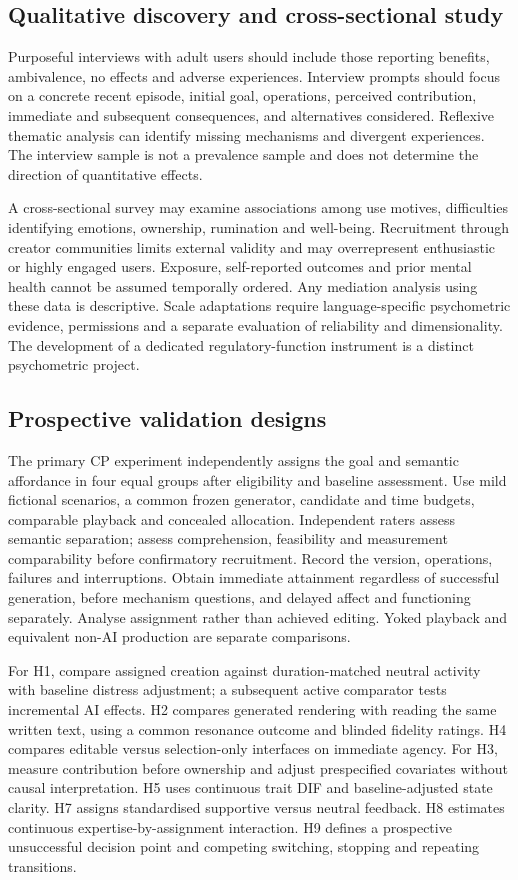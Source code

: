 \documentclass[11pt,a4paper]{article}
\begin{document}
\subsection{Qualitative discovery and cross-sectional study}
Purposeful interviews with adult users should include those reporting benefits, ambivalence, no effects and adverse experiences. Interview prompts should focus on a concrete recent episode, initial goal, operations, perceived contribution, immediate and subsequent consequences, and alternatives considered. Reflexive thematic analysis can identify missing mechanisms and divergent experiences. The interview sample is not a prevalence sample and does not determine the direction of quantitative effects.

A cross-sectional survey may examine associations among use motives, difficulties identifying emotions, ownership, rumination and well-being. Recruitment through creator communities limits external validity and may overrepresent enthusiastic or highly engaged users. Exposure, self-reported outcomes and prior mental health cannot be assumed temporally ordered. Any mediation analysis using these data is descriptive. Scale adaptations require language-specific psychometric evidence, permissions and a separate evaluation of reliability and dimensionality. The development of a dedicated regulatory-function instrument is a distinct psychometric project.

\subsection{Prospective validation designs}
The primary CP experiment independently assigns the goal and semantic affordance in four equal groups after eligibility and baseline assessment. Use mild fictional scenarios, a common frozen generator, candidate and time budgets, comparable playback and concealed allocation. Independent raters assess semantic separation; assess comprehension, feasibility and measurement comparability before confirmatory recruitment. Record the version, operations, failures and interruptions. Obtain immediate attainment regardless of successful generation, before mechanism questions, and delayed affect and functioning separately. Analyse assignment rather than achieved editing. Yoked playback and equivalent non-AI production are separate comparisons.

For H1, compare assigned creation against duration-matched neutral activity with baseline distress adjustment; a subsequent active comparator tests incremental AI effects. H2 compares generated rendering with reading the same written text, using a common resonance outcome and blinded fidelity ratings. H4 compares editable versus selection-only interfaces on immediate agency. For H3, measure contribution before ownership and adjust prespecified covariates without causal interpretation. H5 uses continuous trait DIF and baseline-adjusted state clarity. H7 assigns standardised supportive versus neutral feedback. H8 estimates continuous expertise-by-assignment interaction. H9 defines a prospective unsuccessful decision point and competing switching, stopping and repeating transitions.
\end{document}
